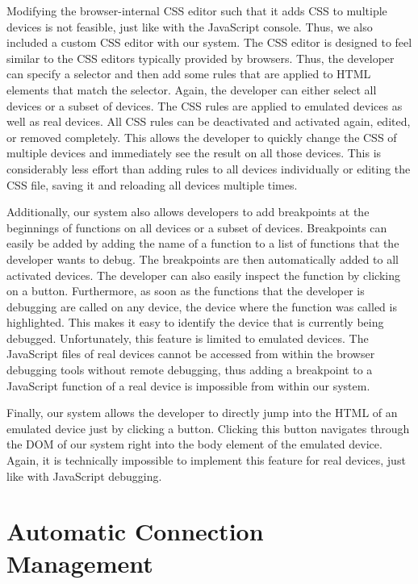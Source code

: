 Modifying the browser-internal CSS editor such that it adds CSS to multiple devices is not feasible, just like with the JavaScript console. Thus, we also included a custom CSS editor with our system. The CSS editor is designed to feel similar to the CSS editors typically provided by browsers. Thus, the developer can specify a selector and then add some rules that are applied to HTML elements that match the selector. Again, the developer can either select all devices or a subset of devices. The CSS rules are applied to emulated devices as well as real devices. All CSS rules can be deactivated and activated again, edited, or removed completely. This allows the developer to quickly change the CSS of multiple devices and immediately see the result on all those devices. This is considerably less effort than adding rules to all devices individually or editing the CSS file, saving it and reloading all devices multiple times.

Additionally, our system also allows developers to add breakpoints at the beginnings of functions on all devices or a subset of devices. Breakpoints can easily be added by adding the name of a function to a list of functions that the developer wants to debug. The breakpoints are then automatically added to all activated devices. The developer can also easily inspect the function by clicking on a button. Furthermore, as soon as the functions that the developer is debugging are called on any device, the device where the function was called is highlighted. This makes it easy to identify the device that is currently being debugged. Unfortunately, this feature is limited to emulated devices. The JavaScript files of real devices cannot be accessed from within the browser debugging tools without remote debugging, thus adding a breakpoint to a JavaScript function of a real device is impossible from within our system. 

Finally, our system allows the developer to directly jump into the HTML of an emulated device just by clicking a button. Clicking this button navigates through the DOM of our system right into the body element of the emulated device. Again, it is technically impossible to implement this feature for real devices, just like with JavaScript debugging.

\section{Automatic Connection Management}

